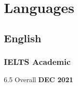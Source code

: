 \documentclass[a4paper]{article}
\begin{document}
    \section{Languages}

    \subsection{English}
        \subsubsection{IELTS Academic}
        {6.5 Overall}
        \hfill
        {\bfseries DEC 2021}
\end{document}
